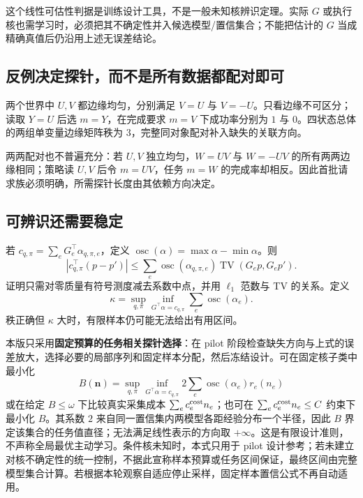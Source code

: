 \documentclass[11pt,a4paper,fontset=fandol]{ctexart}
\theoremstyle{definition}\newtheorem{definition}[theorem]{定义}
\theoremstyle{remark}\newtheorem{remark}[theorem]{说明}
\numberwithin{equation}{section}
\newcommand{\TV}{\operatorname{TV}}\newcommand{\osc}{\operatorname{osc}}
\begin{document}
这个线性可估性判据是训练设计工具，不是一般未知核辨识定理。实际 $G$ 或执行核也需学习时，必须把其不确定性并入候选模型/置信集合；不能把估计的 $G$ 当成精确真值后仍沿用上述无误差结论。

\subsection{反例决定探针，而不是所有数据都配对即可}
两个世界中 $U,V$ 都边缘均匀，分别满足 $V=U$ 与 $V=-U$。只看边缘不可区分；读取 $Y=U$ 后选 $m=Y$，在完成要求 $m=V$ 下成功率分别为 $1$ 与 $0$。四状态总体的两组单变量边缘矩阵秩为 $3$，完整同对象配对补入缺失的关联方向。

两两配对也不普遍充分：若 $U,V$ 独立均匀，$W=UV$ 与 $W=-UV$ 的所有两两边缘相同；策略读 $U,V$ 后令 $m=UV$，任务 $m=W$ 的完成率却相反。因此首批请求族必须明确，所需探针长度由其依赖方向决定。

\subsection{可辨识还需要稳定}
若 $c_{q,\pi}=\sum_eG_e^\top\alpha_{q,\pi,e}$，定义 $\osc(\alpha)=\max\alpha-\min\alpha$。则
\begin{equation}
 |c_{q,\pi}^\top(p-p')|
 \le\sum_e\osc(\alpha_{q,\pi,e})\TV(G_ep,G_ep').
 \label{eq:osc}
\end{equation}
证明只需对零质量有符号测度减去系数中点，并用 $\ell_1$ 范数与 TV 的关系。定义
\begin{equation}
 \kappa=\sup_{q,\pi}\inf_{G^\top\alpha=c_{q,\pi}}
 \sum_e\osc(\alpha_e).
 \label{eq:kappa}
\end{equation}
秩正确但 $\kappa$ 大时，有限样本仍可能无法给出有用区间。

本版只采用\textbf{固定预算的任务相关探针选择}：在 pilot 阶段检查缺失方向与上式的误差放大，选择必要的局部序列和固定样本分配，然后冻结设计。可在固定核子类中最小化
\begin{equation}
 B(\boldsymbol n)=\sup_{q,\pi}\inf_{G^\top\alpha=c_{q,\pi}}
 2\sum_e\osc(\alpha_e)r_e(n_e)
 \label{eq:design}
\end{equation}
或在给定 $B\le\omega$ 下比较真实采集成本 $\sum_e c_e^{\rm cost}n_e$；也可在 $\sum_e c_e^{\rm cost}n_e\le C$ 约束下最小化 $B$。其系数 $2$ 来自同一置信集内两模型各距经验分布一个半径，因此 $B$ 界定该集合的任务值直径；无法满足线性表示的方向取 $+\infty$。这是有限设计准则，不声称全局最优主动学习。条件核未知时，本式只用于 pilot 设计参考；若未建立对核不确定性的统一控制，不据此宣称样本预算或任务区间保证，最终区间由完整模型集合计算。若根据本轮观察自适应停止采样，固定样本置信公式不再自动适用。
\end{document}
